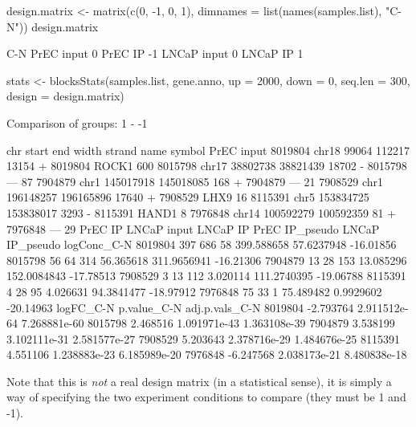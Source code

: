 \begin{Schunk}
\begin{Sinput}
 design.matrix <- matrix(c(0, -1, 0, 1), dimnames = list(names(samples.list), 
     "C-N"))
 design.matrix
\end{Sinput}
\begin{Soutput}
            C-N
PrEC input    0
PrEC IP      -1
LNCaP input   0
LNCaP IP      1
\end{Soutput}
\begin{Sinput}
 stats <- blocksStats(samples.list, gene.anno, up = 2000, down = 0, 
     seq.len = 300, design = design.matrix)
\end{Sinput}
\begin{Soutput}
Comparison of groups:  1 - -1 
\end{Soutput}
\begin{Soutput}
          chr     start       end width strand    name symbol PrEC input
8019804 chr18     99064    112217 13154      + 8019804  ROCK1        600
8015798 chr17  38802738  38821439 18702      - 8015798    ---         87
7904879  chr1 145017918 145018085   168      + 7904879    ---         21
7908529  chr1 196148257 196165896 17640      + 7908529   LHX9         16
8115391  chr5 153834725 153838017  3293      - 8115391  HAND1          8
7976848 chr14 100592279 100592359    81      + 7976848    ---         29
        PrEC IP LNCaP input LNCaP IP PrEC IP_pseudo LNCaP IP_pseudo logConc_C-N
8019804     397         686       58     399.588658      57.6237948   -16.01856
8015798      56          64      314      56.365618     311.9656941   -16.21306
7904879      13          28      153      13.085296     152.0084843   -17.78513
7908529       3          13      112       3.020114     111.2740395   -19.06788
8115391       4          28       95       4.026631      94.3841477   -18.97912
7976848      75          33        1      75.489482       0.9929602   -20.14963
        logFC_C-N  p.value_C-N adj.p.vals_C-N
8019804 -2.793764 2.911512e-64   7.268881e-60
8015798  2.468516 1.091971e-43   1.363108e-39
7904879  3.538199 3.102111e-31   2.581577e-27
7908529  5.203643 2.378716e-29   1.484676e-25
8115391  4.551106 1.238883e-23   6.185989e-20
7976848 -6.247568 2.038173e-21   8.480838e-18
\end{Soutput}
\end{Schunk}

\noindent Note that this is {\em not} a real design matrix (in a statistical sense), it is simply a way of specifying the two experiment conditions to compare (they must be 1 and -1). \\

